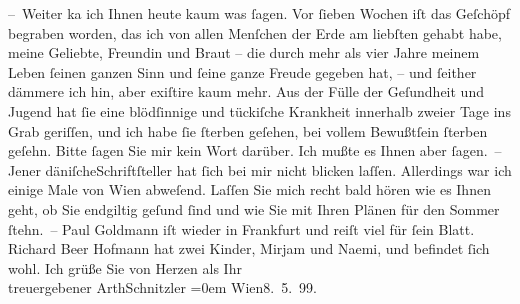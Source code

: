 \begin{ledgroupsized}[t]{13cm}
           \pstart
           – Weiter ka{\geminationn} ich Ihnen heute kaum was ſagen. Vor
                    ſieben Wochen iſt das Geſchöpf begraben worden, das ich von allen {\pb}Menſchen der Erde am liebſten gehabt
                    habe, meine Geliebte, Freundin und Braut – die durch mehr als vier Jahre meinem
                    Leben ſeinen ganzen Sinn und ſeine ganze Freude gegeben hat, – und ſeither
                    dämmere ich hin, aber exiſtire kaum mehr. Aus der Fülle der Geſundheit und
                    Jugend hat ſie eine blödſinnige und tückiſche Krankheit innerhalb zweier Tage
                    ins Grab geriſſen, und ich habe ſie ſterben geſehen, bei vollem Bewußt{\pb}ſein ſterben geſehn. Bitte ſagen Sie mir
                    kein Wort darüber. Ich mußte es Ihnen aber ſagen. –\pend
           \pstart
           Jener däniſcheSchriftſteller hat ſich bei
                    mir nicht blicken laſſen. Allerdings war ich einige Male von Wien abweſend. Laſſen Sie mich recht bald hören wie es
                    Ihnen geht, ob Sie endgiltig geſund ſind und wie Sie mit Ihren Plänen für den
                    Sommer ſtehn. –\pend
           \pstart
           Paul Goldmann iſt wieder in Frankfurt und reiſt viel für ſein Blatt.\pend
           \pstart
           {\pb}Richard Beer Hofmann hat zwei Kinder, Mirjam und Naemi, und befindet ſich
                    wohl.\pend
           \pstart
           Ich grüße Sie von Herzen als Ihr{\\[\baselineskip]}treuergebener
                        \spacefill\mbox{ArthSchnitzler}\pend
           \leftskip=0em{}\pstart
           Wien8. 5. 99.\pend
           
         
         \endnumbering{}\end{ledgroupsized}  \newcommand{\dateiname}{L00915}\newcommand{\titel}{Arthur Schnitzler an Georg Brandes, 8. 5. 1899}\newcommand{\editorInnen}{Martin Anton Müller und Gerd-Hermann Susen}
      